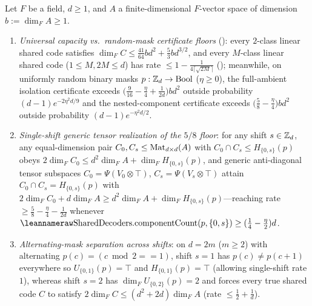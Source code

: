 \begin{proposition}\label{prop:mask-floors}
Let $F$ be a field, $d \ge 1$, and $A$ a finite-dimensional $F$-vector space of dimension
$b := \dim_F A \ge 1$.
\begin{enumerate}[label=(\alph*)]
\item \emph{Universal capacity vs.\ random-mask certificate floors}
  (\cite[Theorems~3.4, 3.5, C.6, and~C.7]{SharedDecoders2026}): every $2$-class linear shared code
  satisfies $\dim_F C \le \frac{41}{64} b d^2 + \frac{5}{3} b d^{3/2}$, and every $M$-class linear
  shared code ($1 \le M, 2M \le d$) has rate $\le 1 - \frac{1}{4\lceil\sqrt{2M}\rceil}$
  (); meanwhile, on uniformly random binary masks $p : \mathbb{Z}_d \to \mathrm{Bool}$
  ($\eta \ge 0$), the full-ambient isolation certificate exceeds
  $\bigl(\frac{9}{16} - \frac{\eta}{4} + \frac{1}{2d}\bigr)bd^2$ outside probability
  $(d-1)e^{-2\eta^2 d / 9}$ and the nested-component certificate exceeds
  $\bigl(\frac{5}{8} - \frac{\eta}{4}\bigr)bd^2$ outside probability $(d-1)e^{-\eta^2 d / 2}$.
\item \emph{Single-shift generic tensor realization of the $5/8$ floor}: for any shift $s \in \mathbb{Z}_d$,
  any equal-dimension pair $C_0, C_s \le \operatorname{Mat}_{d\times d}(A)$ with $C_0 \cap C_s \le H_{\{0,s\}}(p)$
  obeys $2\dim_F C_0 \le d^2\dim_F A + \dim_F H_{\{0,s\}}(p)$, and generic anti-diagonal tensor
  subspaces $C_0 = \Psi(V_0 \otimes \top)$, $C_s = \Psi(V_s \otimes \top)$ attain
  $C_0 \cap C_s = H_{\{0,s\}}(p)$ with
  $2\dim_F C_0 + d\dim_F A \ge d^2\dim_F A + \dim_F H_{\{0,s\}}(p)$---reaching rate
  $\ge \frac{5}{8} - \frac{\eta}{4} - \frac{1}{2d}$ whenever
  $\leanname{SharedDecoders.componentCount}(p, \{0,s\}) \ge (\frac{1}{4} - \frac{\eta}{2})d$.
\item \emph{Alternating-mask separation across shifts}: on $d = 2m$ ($m \ge 2$) with alternating
  $p(c) = (c \bmod 2 == 1)$, shift $s = 1$ has $p(c) \ne p(c+1)$ everywhere so
  $U_{\{0,1\}}(p) = \top$ and $H_{\{0,1\}}(p) = \top$ (allowing single-shift rate $1$), whereas
  shift $s = 2$ has $\dim_F U_{\{0,2\}}(p) = 2$ and forces every true shared code $C$ to satisfy
  $2\dim_F C \le (d^2 + 2d)\dim_F A$ (rate $\le \frac{1}{2} + \frac{1}{d}$).
\end{enumerate}
\end{proposition}
